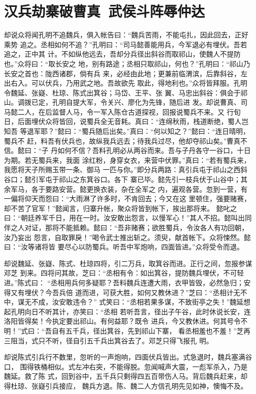 \chapter{汉兵劫寨破曹真~武侯斗阵辱仲达}

却说众将闻孔明不追魏兵，俱入帐告曰：“魏兵苦雨，不能屯扎，因此回去，正好乘势
追之。丞相如何不追？”孔明曰：“司马懿善能用兵，今军退必有埋伏。吾若追之，正中其
计。不如纵他远去，吾却分兵径出斜谷而取祁山，使魏人不提防也。”众将曰：“取长安之
地，别有路途；丞相只取祁山，何也？”孔明曰：“祁山乃长安之首也：陇西诸郡，倘有兵
来，必经由此地；更兼前临渭滨，后靠斜谷，左出右入。可以伏兵，乃用武之地。吾故欲先
取此，得地利也。”众将皆拜服。孔明令魏延、张嶷、杜琼、陈式出箕谷；马岱、王平、张
翼、马忠出斜谷：俱会于祁山。调拨已定，孔明自提大军，令关兴、廖化为先锋，随后进
发。却说曹真、司马懿二人，在后监督人马，令一军入陈仓古道探视，回报说蜀兵不来。又
行旬日，后面埋伏众将皆回，说蜀兵全无音耗。真曰：“连绵秋雨，栈道断绝，蜀人岂知吾
等退军耶？”懿曰：“蜀兵随后出矣。”真曰：“何以知之？”懿曰：“连日晴明，蜀兵不
赶，料吾有伏兵也，故纵我兵远去；待我兵过尽，他却夺祁山矣。”曹真不信。懿曰：“子
丹如何不信？吾料孔明必从两谷而来。吾与子丹各守一谷口，十日为期。若无蜀兵来，我面
涂红粉，身穿女衣，来营中伏罪。”真曰：“若有蜀兵来，我愿将天子所赐玉带一条、御马
一匹与你。”即分兵两路：真引兵屯于祁山之西斜谷口；懿引军屯于祁山之东箕谷口。各下
寨已毕。懿先引一枝兵伏于山谷中；其余军马，各于要路安营。懿更换衣装，杂在全军之
内，遍观各营。忽到一营，有一偏将仰天而怨曰：“大雨淋了许多时，不肯回去；今又在这
里顿住，强要赌赛，却不苦了官军！”懿闻言，归寨升帐，聚众将皆到帐下，挨出那将来。
懿叱之曰：“朝廷养军千日，用在一时。汝安敢出怨言，以慢军心！”其人不招。懿叫出同
伴之人对证，那将不能抵赖。懿曰：“吾非赌赛；欲胜蜀兵，令汝各人有功回朝，汝乃妄出
怨言，自取罪戾！”喝令武士推出斩之。须臾，献首帐下。众将悚然。懿曰：“汝等诸将皆
要尽心以防蜀兵。听吾中军炮响，四面皆进。”众将受令而退。

却说魏延、张嶷、陈式、杜琼四将，引二万兵，取箕谷而进。正行之间，忽报参谋邓芝
到来。四将问其故，芝曰：“丞相有令：如出箕谷，提防魏兵埋伏，不可轻进。”陈式曰：
“丞相用兵何多疑耶？吾料魏兵连遭大雨，衣甲皆毁，必然急归；安得又有埋伏？今吾兵倍
道而进，可获大胜，如何又教休进？”芝曰：“丞相计无不中，谋无不成，汝安敢违令？”
式笑曰：“丞相若果多谋，不致街亭之失！”魏延想起孔明向日不听其计，亦笑曰：“丞相
若听吾言，径出子午谷，此时休说长安，连洛阳皆得矣！今执定要出祁山。有何益耶？既令
进兵，今又教休进。何其号令不明！”式曰：“吾自有五千兵，径出箕谷，先到祁山下寨，
看丞相羞也不羞！”芝再三阻当，式只不听，径自引五千兵出箕谷去了。邓芝只得飞报孔
明。

却说陈式引兵行不数里，忽听的一声炮响，四面伏兵皆出。式急退时，魏兵塞满谷口，
围得铁桶相似。式左冲右突，不能得脱。忽闻喊声大震，一彪军杀入，乃是魏延。救了陈
式，回到谷中，五千兵只剩得四五百带伤人马。背后魏兵赶来，却得杜琼、张嶷引兵接应，
魏兵方退。陈、魏二人方信孔明先见如神，懊悔不及。

